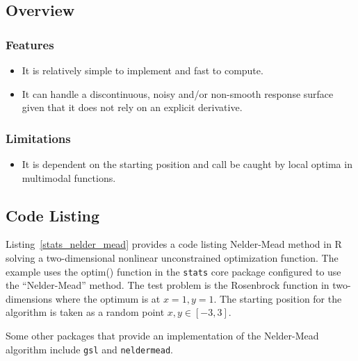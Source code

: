 \subsection{Overview}

\subsubsection{Features}

\begin{itemize}
	\item It is relatively simple to implement and fast to compute.
	\item It can handle a discontinuous, noisy and/or non-smooth response surface given that it does not rely on an explicit derivative.
\end{itemize}

\subsubsection{Limitations}

\begin{itemize}
	\item It is dependent on the starting position and call be caught by local optima in multimodal functions.
\end{itemize}

\subsection{Code Listing}
Listing~\ref{stats_nelder_mead} provides a code listing Nelder-Mead method in R solving a two-dimensional nonlinear unconstrained optimization function.
The example uses the {optim()} function in the \texttt{stats} core package configured to use the ``Nelder-Mead'' method. 
The test problem is the Rosenbrock function in two-dimensions where the optimum is at $x=1, y=1$. The starting position for the algorithm is taken as a random point $x,y \in [-3,3]$.



Some other packages that provide an implementation of the Nelder-Mead algorithm include \texttt{gsl} and \texttt{neldermead}.


